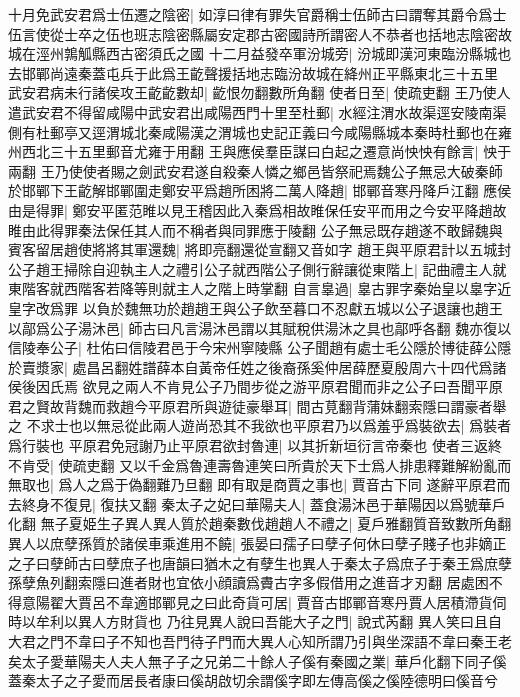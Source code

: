 十月免武安君爲士伍遷之陰密|{
	如淳曰律有罪失官爵稱士伍師古曰謂奪其爵令爲士伍言使從士卒之伍也班志陰密縣屬安定郡古密國詩所謂密人不恭者也括地志陰密故城在涇州鶉觚縣西古密須氏之國}
十二月益發卒軍汾城旁|{
	汾城即漢河東臨汾縣城也去邯鄲尚遠秦蓋屯兵于此爲王齕聲援括地志臨汾故城在絳州正平縣東北三十五里}
武安君病未行諸侯攻王齕齕數却|{
	齕恨勿翻數所角翻}
使者日至|{
	使疏吏翻}
王乃使人遣武安君不得留咸陽中武安君出咸陽西門十里至杜郵|{
	水經注渭水故渠逕安陵南渠側有杜郵亭又逕渭城北秦咸陽漢之渭城也史記正義曰今咸陽縣城本秦時杜郵也在雍州西北三十五里郵音尤雍于用翻}
王與應侯羣臣謀曰白起之遷意尚怏怏有餘言|{
	怏于兩翻}
王乃使使者賜之劍武安君遂自殺秦人憐之鄉邑皆祭祀焉魏公子無忌大破秦師於邯鄲下王齕解邯鄲圍走鄭安平爲趙所困將二萬人降趙|{
	邯鄲音寒丹降戶江翻}
應侯由是得罪|{
	鄭安平匿范睢以見王稽因此入秦爲相故睢保任安平而用之今安平降趙故睢由此得罪秦法保任其人而不稱者與同罪應于陵翻}
公子無忌既存趙遂不敢歸魏與賓客留居趙使將將其軍還魏|{
	將即亮翻還從宣翻又音如字}
趙王與平原君計以五城封公子趙王掃除自迎執主人之禮引公子就西階公子側行辭讓從東階上|{
	記曲禮主人就東階客就西階客若降等則就主人之階上時掌翻}
自言辠過|{
	辠古罪字秦始皇以辠字近皇字改爲罪}
以負於魏無功於趙趙王與公子飲至暮口不忍獻五城以公子退讓也趙王以鄗爲公子湯沐邑|{
	師古曰凡言湯沐邑謂以其賦稅供湯沐之具也鄗呼各翻}
魏亦復以信陵奉公子|{
	杜佑曰信陵君邑于今宋州寧陵縣}
公子聞趙有處士毛公隱於博徒薛公隱於賣漿家|{
	處昌呂翻姓譜薛本自黃帝任姓之後裔孫奚仲居薛歷夏殷周六十四代爲諸侯後因氏焉}
欲見之兩人不肯見公子乃間步從之游平原君聞而非之公子曰吾聞平原君之賢故背魏而救趙今平原君所與遊徒豪舉耳|{
	間古莧翻背蒲妹翻索隱曰謂豪者舉之}
不求士也以無忌從此兩人遊尚恐其不我欲也平原君乃以爲羞乎爲裝欲去|{
	爲裝者爲行裝也}
平原君免冠謝乃止平原君欲封魯連|{
	以其折新垣衍言帝秦也}
使者三返終不肯受|{
	使疏吏翻}
又以千金爲魯連壽魯連笑曰所貴於天下士爲人排患釋難解紛亂而無取也|{
	爲人之爲于偽翻難乃旦翻}
即有取是商賈之事也|{
	賈音古下同}
遂辭平原君而去終身不復見|{
	復扶又翻}
秦太子之妃曰華陽夫人|{
	蓋食湯沐邑于華陽因以爲號華戶化翻}
無子夏姫生子異人異人質於趙秦數伐趙趙人不禮之|{
	夏戶雅翻質音致數所角翻}
異人以庶孽孫質於諸侯車乘進用不饒|{
	張晏曰孺子曰孽子何休曰孽子賤子也非嫡正之子曰孽師古曰孽庶子也唐韻曰猶木之有孽生也異人于秦太子爲庶子于秦王爲庶孽孫孽魚列翻索隱曰進者財也宜依小顔讀爲賮古字多假借用之進音才刃翻}
居處困不得意陽翟大賈呂不韋適邯鄲見之曰此奇貨可居|{
	賈音古邯鄲音寒丹賈人居積滯貨伺時以牟利以異人方財貨也}
乃往見異人說曰吾能大子之門|{
	說式芮翻}
異人笑曰且自大君之門不韋曰子不知也吾門待子門而大異人心知所謂乃引與坐深語不韋曰秦王老矣太子愛華陽夫人夫人無子子之兄弟二十餘人子傒有秦國之業|{
	華戶化翻下同子傒蓋秦太子之子愛而居長者康曰傒胡啟切余謂傒字即左傳高傒之傒陸德明曰傒音兮}
